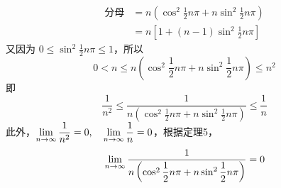 \begin{solution}
\[\begin{split}
    \text{分母}&=n\left(\cos^2\frac{1}{2}n\pi+n\sin^2\frac{1}{2}n\pi\right)\\
    &=n\left[1+(n-1)\sin^2\frac{1}{2}n\pi\right]
\end{split}\]
又因为 $0\le \sin^2\frac{1}{2}n\pi\le 1$，所以
\[0<n\le n\left(\cos^2\frac{1}{2}n\pi+n\sin^2\frac{1}{2}n\pi\right)\le n^2\]
即
\[\frac{1}{n^2}\le \frac{1}{n\left(\cos^2\frac{1}{2}n\pi+n\sin^2\frac{1}{2}n\pi\right)}\le \frac{1}{n}\]
此外，$\displaystyle\lim_{n\to\infty}\dfrac{1}{n^2}=0,\quad \displaystyle\lim_{n\to\infty}\dfrac{1}{n}=0$，根据定理5，
\[\displaystyle\lim_{n\to\infty}\dfrac{1}{n\left(\cos^2\dfrac{1}{2}n\pi+n\sin^2\dfrac{1}{2}n\pi\right)}=0\]
\end{solution}

















\begin{example}
    
\end{example}



\begin{solution}
    
\end{solution}
\begin{example}
    
\end{example}

\begin{solution}
    
\end{solution}

\begin{example}
    
\end{example}




\begin{solution}
    
\end{solution}

\begin{solution}
    
\end{solution}

